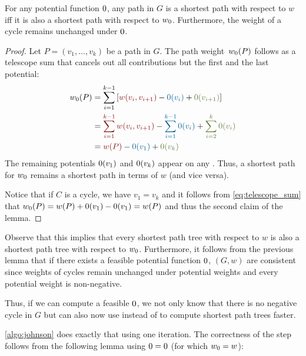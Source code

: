 \begin{lemma}\label{lem:shortest_paths_unchanged}
  For any potential function $\pot$, any path in $G$ is a shortest path with respect to $w$ iff it is also a shortest path with respect to $\wpot$.
  Furthermore, the weight of a cycle remains unchanged under $\pot$.
\end{lemma}
\begin{proof}
  Let $P = (v_1,\ldots,v_k)$ be a path in $G$.
  The path weight~$w_{\pot}(P)$ follows as a telescope sum that cancels out all contributions but the first and the last potential:
  \begin{align}
    w_{\pot}(P) &= \sum_{i = 1}^{k - 1} \left[ \textcolor{DarkRed}{w(v_i, v_{i + 1})} - \textcolor{GoetheBlue}{\pot(v_i)} + \textcolor{Green}{\pot(v_{i + 1})} \right] \nonumber \\
                &= \textcolor{DarkRed}{\sum_{i = 1}^{k - 1} w(v_i, v_{i + 1})}
                        - \textcolor{GoetheBlue}{\sum_{i = 1}^{k - 1} \pot(v_i)}
                        + \textcolor{Green}{\sum_{i = 2}^{k} \pot(v_i)} \nonumber \\ \label{eq:telescope_sum}
                &= \textcolor{DarkRed}{w(P)} - \textcolor{GoetheBlue}{\pot(v_1)} + \textcolor{Green}{\pot(v_k)}
  \end{align}
  The remaining potentials $\pot(v_1)$ and $\pot(v_k)$ appear on any .
  Thus, a shortest path for $\wpot$ remains a shortest path in terms of $w$ (and vice versa).

  Notice that if $C$ is a cycle, we have $v_1 = v_k$ and it follows from \cref{eq:telescope_sum} that $\wpot(P) = w(P) + \pot(v_1) - \pot(v_1) = w(P)$ and thus the second claim of the lemma.
  \hfill
\end{proof}

\noindent Observe that this implies that every shortest path tree with respect to $w$ is also a shortest path tree with respect to $\wpot$. 
Furthermore, it follows from the previous lemma that if there exists a feasible potential function $\pot$, $(G, w)$ are consistent since weights of cycles remain unchanged under potential weights and every potential weight is non-negative.

Thus, if we can compute a feasible $\pot$, we not only know that there is no negative cycle in $G$ but can also now use \algdk instead of \algbf to compute shortest path trees faster.

\cref{algo:johnson} does exactly that using one \algbf iteration.
The correctness of the step follows from the following lemma using $\pot = 0$ (for which $\wpot = w$):

